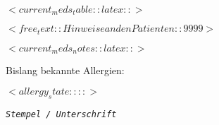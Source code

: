 \documentclass[
	version=last,
	paper=portrait,
	paper=a4,
	DIV=9,									%
	BCOR=0mm,								%
	fontsize=12pt,							%
	parskip=full,							%
	headsepline=off,
	footsepline=on,
	titlepage=false
]{scrartcl}
\begin{document}

$<current_meds_table::latex::>$


$<free_text::Hinweise an den Patienten::9999>$

\clearpage
$<current_meds_notes::latex::>$

\noindent Bislang bekannte Allergien:

\noindent $<allergy_state::::>$

\noindent {}

\medskip{}

\noindent \begin{flushright}
\texttt{\textsl{\footnotesize Stempel / Unterschrift}}
\par\end{flushright}

\end{document}
